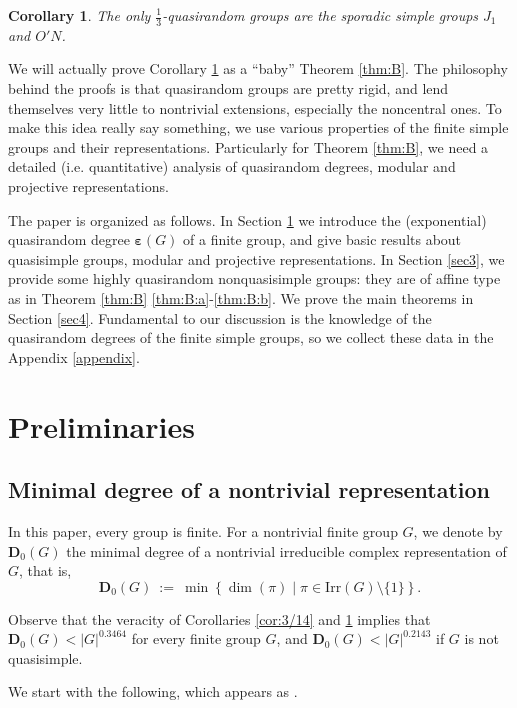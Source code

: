 \documentclass{daj}
\newtheorem{corollaryX}[theoremX]{Corollary}
\theoremstyle{definition}
\theoremstyle{remark}
\newcommand{\Irr}{\mathrm{Irr}}
\newcommand{\D}{\mathbf{D}}
\renewcommand{\a}{\boldsymbol{\varepsilon}}
\begin{document}
	\begin{corollaryX} \label{cor:1/3}
		The only $\frac{1}{3}$-quasirandom groups are the sporadic simple groups $J_1$ and $O'N$.
	\end{corollaryX}

	We will actually prove Corollary \ref{cor:1/3} as a ``baby'' Theorem \ref{thm:B}.
	The philosophy behind the proofs is that quasirandom groups are pretty rigid,
	and lend themselves very little to nontrivial extensions, especially the noncentral ones.
	To make this idea really say something, we use various properties of the finite simple groups and their representations.
	Particularly for Theorem \ref{thm:B}, we need a detailed (i.e. quantitative) analysis of quasirandom degrees,
	modular and projective representations.
	
	The paper is organized as follows.
	In Section \ref{sec2} we introduce the (exponential) quasirandom degree $\a(G)$ of a finite group,
	and give basic results about quasisimple groups, modular and projective representations.
	In Section \ref{sec3}, we provide some highly quasirandom nonquasisimple groups:
	they are of affine type as in Theorem \ref{thm:B} \ref{thm:B:a}-\ref{thm:B:b}.
	We prove the main theorems in Section \ref{sec4}.
	Fundamental to our discussion is the knowledge of the quasirandom degrees of the finite simple groups,
	so we collect these data in the Appendix \ref{appendix}.

    \section{Preliminaries} \label{sec2}

\subsection{Minimal degree of a nontrivial representation} 

In this paper, every group is finite.
For a nontrivial finite group $G$,
we denote by $\D_0(G)$ the minimal degree of a nontrivial irreducible complex representation of $G$, that is,
$$ \D_0(G) \> := \> \min \left\{ \dim(\pi) \mid \pi \in \Irr(G) \setminus \{1\} \right\}  . $$

Observe that the veracity of Corollaries \ref{cor:3/14} and \ref{cor:1/3} implies that $\D_0(G) < |G|^{0.3464}$ for every finite group $G$, and $\D_0(G) < |G|^{0.2143}$ if $G$ is not quasisimple.

We start with the following, which appears as \cite[Ex. 1.3.2]{Tao15}.
\end{document}
